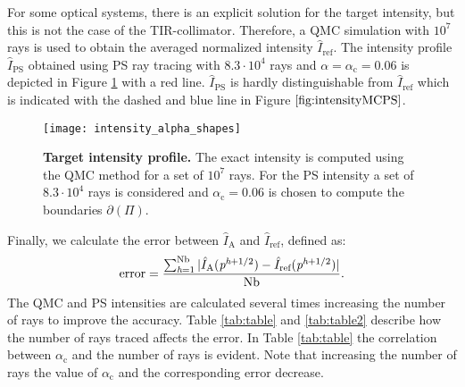For some optical systems, there is an explicit solution for the target intensity, but this is not the case of the TIR-collimator.
Therefore, a QMC simulation with $10^7$ rays is used to obtain the averaged normalized intensity $\hat{I}_{\textrm{ref}}$.
The intensity profile $\hat{I}_{\textrm{PS}}
$ obtained using PS ray tracing with $8.3\cdot 10^4$ rays and $\alpha= \alpha_\textrm{c} = 0.06$ is depicted in Figure \ref{fig:intensityMCPS} with a red line.
$\hat{I}_{\textrm{PS}}$ is hardly distinguishable from $\hat{I}_{\textrm{ref}}$ which is indicated with the dashed and blue line in Figure $\ref{fig:intensityMCPS}$.\\ \indent
  \begin{figure}[h]
    \centering
    \texttt{[image: intensity\_alpha\_shapes]}
\caption{\textbf{Target intensity profile.}
The exact intensity is computed using the QMC method for a set of $10^7$ rays. For the PS intensity a set of $8.3\cdot 10^4$
rays is considered and $\alpha_\textrm{c} = 0.06$ is chosen to compute the boundaries $\partial$$(\Pi)$.}
  \label{fig:intensityMCPS}
\end{figure}
Finally, we calculate the error between $\hat{I}_{\textrm{A}}$ and $\hat{I}_{\textrm{ref}}$, defined as:
\begin{equation}\label{eq:error}
\mbox{error} = \frac{\sum_{\textit{h}= 1}^{\textrm{Nb}}| \hat{I}_{\textrm{A}}(\textit{p}^{\textit{h}+1/2}) - \hat{I}_{\textrm{ref}}(\textit{p}^{\textit{h}+1/2})|}{\textrm{Nb}}.
\end{equation}
The QMC and PS intensities are calculated several times increasing the number of rays to improve the accuracy.
Table \ref{tab:table} and \ref{tab:table2} describe how the number of rays traced affects the error. 
In Table \ref{tab:table} the correlation between $\alpha_\textrm{c}$ and the number of rays is evident.
Note that increasing the number of rays the value of $\alpha_\textrm{c}$ and the corresponding error decrease. 
